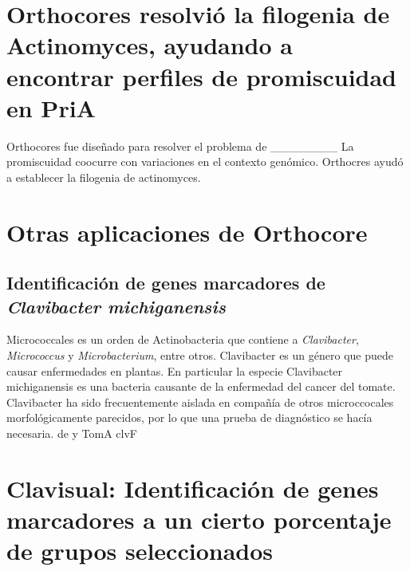 \documentclass[12pt,twoside]{reedthesis}
\begin{document}
  \section{Orthocores resolvió la filogenia de Actinomyces, ayudando a
  encontrar perfiles de promiscuidad en
  PriA}\label{orthocores-resolvio-la-filogenia-de-actinomyces-ayudando-a-encontrar-perfiles-de-promiscuidad-en-pria}
  
  Orthocores fue diseñado para resolver el problema de \_\_\_\_\_\_\_\_ La
  promiscuidad coocurre con variaciones en el contexto genómico. Orthocres
  ayudó a establecer la filogenia de actinomyces.
  
  \section{Otras aplicaciones de
  Orthocore}\label{otras-aplicaciones-de-orthocore}
  
  \subsection{\texorpdfstring{Identificación de genes marcadores de
  \emph{Clavibacter
  michiganensis}}{Identificación de genes marcadores de Clavibacter michiganensis}}\label{identificacion-de-genes-marcadores-de-clavibacter-michiganensis}
  
  Micrococcales es un orden de Actinobacteria que contiene a
  \emph{Clavibacter}, \emph{Micrococcus} y \emph{Microbacterium}, entre
  otros. Clavibacter es un género que puede causar enfermedades en
  plantas. En particular la especie Clavibacter michiganensis es una
  bacteria causante de la enfermedad del cancer del tomate. Clavibacter ha
  sido frecuentemente aislada en compañía de otros microccocales
  morfológicamente parecidos, por lo que una prueba de diagnóstico se
  hacía necesaria. de y TomA clvF
  
  \section{Clavisual: Identificación de genes marcadores a un cierto
  porcentaje de grupos
  seleccionados}\label{clavisual-identificacion-de-genes-marcadores-a-un-cierto-porcentaje-de-grupos-seleccionados}
  
\end{document}
